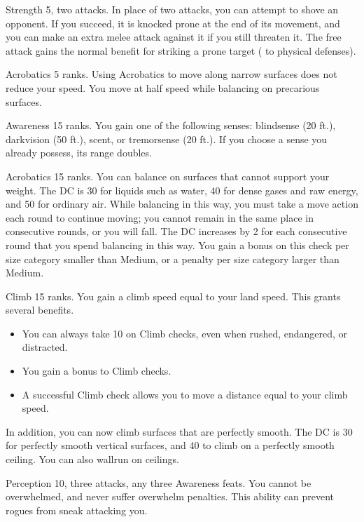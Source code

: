 \featpre Strength 5, two attacks.
\featben In place of two attacks, you can attempt to shove an opponent.
If you succeed, it is knocked prone at the end of its movement, and you can make an extra melee attack against it if you still threaten it.
The free attack gains the normal benefit for striking a prone target ( to physical defenses).

\featpre Acrobatics 5 ranks.
\featben Using Acrobatics to move along narrow surfaces does not reduce your speed.
You move at half speed while balancing on precarious surfaces.

\featpre Awareness 15 ranks.
\featben You gain one of the following senses: blindsense (20 ft.), darkvision (50 ft.), scent, or tremorsense (20 ft.).
If you choose a sense you already possess, its range doubles.

\featpre Acrobatics 15 ranks.
\featben You can balance on surfaces that cannot support your weight.
The DC is 30 for liquids such as water, 40 for dense gases and raw energy, and 50 for ordinary air.
While balancing in this way, you must take a move action each round to continue moving; you cannot remain in the same place in consecutive rounds, or you will fall.
The DC increases by 2 for each consecutive round that you spend balancing in this way.
You gain a  bonus on this check per size category smaller than Medium, or a  penalty per size category larger than Medium.

\featpre Climb 15 ranks.
\featben You gain a climb speed equal to your land speed.
This grants several benefits.
\begin{itemize}
    \item You can always take 10 on Climb checks, even when rushed, endangered, or distracted.
    \item You gain a  bonus to Climb checks.
    \item A successful Climb check allows you to move a distance equal to your climb speed.
\end{itemize}

In addition, you can now climb surfaces that are perfectly smooth.
The DC is 30 for perfectly smooth vertical surfaces, and 40 to climb on a perfectly smooth ceiling.
You can also wallrun on ceilings.

\featpres Perception 10, three attacks, any three Awareness feats.
\featben You cannot be overwhelmed, and never suffer overwhelm penalties.
This ability can prevent rogues from sneak attacking you.

